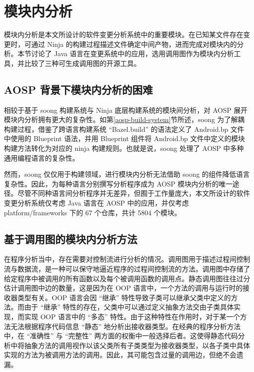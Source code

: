 \section{模块内分析}\label{intramodule-analysis}

模块内分析是本文所设计的软件变更分析系统中的重要模块。在已知某文件存在变更时，可通过 Ninja 的构建过程描述文件确定中间产物，进而完成对模块内的分析。本节讨论了 Java 语言在变更系统中的应用，选用调用图作为模块内分析工具，并比较了三种可生成调用图的开源工具。

\subsection{AOSP 背景下模块内分析的困难}

相较于基于 soong 构建系统与 Ninja 底层构建系统的模块间分析，对 AOSP 展开模块内分析拥有更大的复杂性。如第\ref{aosp-build-system}节所述，soong 为了解耦构建过程，借鉴了跨语言构建系统 “Bazel.build” 的语法定义了 Android.bp 文件中使用的 Blueprint 语法，并用 Blueprint 组件将 Android.bp 文件中定义的模块构建方法转化为对应的 ninja 构建规则。也就是说，soong 处理了 AOSP 中多种通用编程语言的复杂性。

然而，soong 仅仅用于构建领域，进行模块内分析无法借助 soong 的组件降低语言复杂性。因此，为每种语言分别撰写分析程序成为 AOSP 模块内分析的唯一途径。尽管不同种语言间分析程序并无差异，但囿于工作量庞大，本文所设计的软件变更分析系统仅考虑 Java 语言在 AOSP 中的应用，并仅考虑 platform/frameworks 下的 67 个仓库，共计 5804 个模块。

\subsection{基于调用图的模块内分析方法}

在程序分析当中，存在需要对控制流进行分析的情况。调用图用于描述过程间控制流与数据流，是一种可以保守地逼近程序的过程间控制流的方法。调用图中存储了给定程序中被调用的所有函数以及每个被调用函数的调用点\cite{MoellerS20}。静态调用图往往过分估计调用图中边的数量，这是因为在 OOP 语言中，一个方法的调用与运行时的接收器类型有关\cite{JSP19}。OOP 语言会因 “继承” 特性导致子类可以继承父类中定义的方法。而由于 “继承” 特性的存在，父类中可以通过定义抽象方法交由子类具体实现，而实现 OOP 语言中的 “多态” 特性。由于这种特性在作用时，对于某一个方法无法根据程序代码信息 “静态” 地分析出接收器类型。在经典的程序分析方法中，在 “准确性” 与 “完整性” 两方面的权衡中一般选择后者。这使得静态代码分析中将抽象方法的调用视作以该父类所有子类类型为接收器类型，以各子类中具体实现的方法为被调用方法的调用。因此，其可能包含过量的调用边，但绝不会遗漏。


